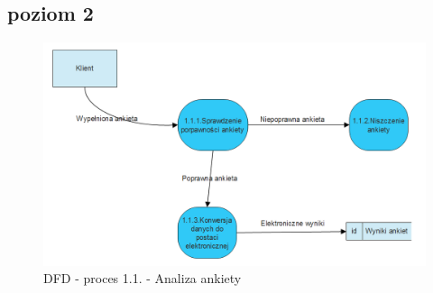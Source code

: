 \documentclass[a4paper, 11pt]{article}
\begin{document}
	\subsection{poziom 2}
	\indent
	\begin{figure}[H]%
			\center
			\includegraphics[scale=0.5]{Img/1-1.png}
			\caption{DFD - proces 1.1. - Analiza ankiety}
	\end{figure}
\end{document}

